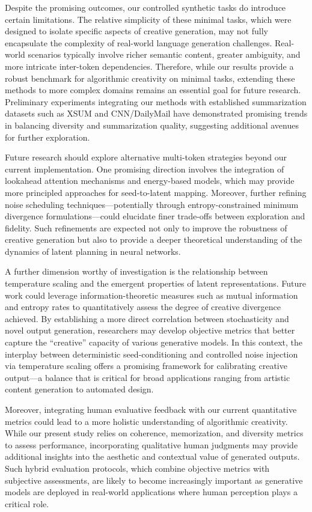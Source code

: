 \documentclass{article} %
\begin{document}
Despite the promising outcomes, our controlled synthetic tasks do introduce certain limitations. The relative simplicity of these minimal tasks, which were designed to isolate specific aspects of creative generation, may not fully encapsulate the complexity of real-world language generation challenges. Real-world scenarios typically involve richer semantic content, greater ambiguity, and more intricate inter-token dependencies. Therefore, while our results provide a robust benchmark for algorithmic creativity on minimal tasks, extending these methods to more complex domains remains an essential goal for future research. Preliminary experiments integrating our methods with established summarization datasets such as XSUM and CNN/DailyMail have demonstrated promising trends in balancing diversity and summarization quality, suggesting additional avenues for further exploration.

Future research should explore alternative multi-token strategies beyond our current implementation. One promising direction involves the integration of lookahead attention mechanisms and energy-based models, which may provide more principled approaches for seed-to-latent mapping. Moreover, further refining noise scheduling techniques—potentially through entropy-constrained minimum divergence formulations—could elucidate finer trade-offs between exploration and fidelity. Such refinements are expected not only to improve the robustness of creative generation but also to provide a deeper theoretical understanding of the dynamics of latent planning in neural networks.

A further dimension worthy of investigation is the relationship between temperature scaling and the emergent properties of latent representations. Future work could leverage information-theoretic measures such as mutual information and entropy rates to quantitatively assess the degree of creative divergence achieved. By establishing a more direct correlation between stochasticity and novel output generation, researchers may develop objective metrics that better capture the “creative” capacity of various generative models. In this context, the interplay between deterministic seed-conditioning and controlled noise injection via temperature scaling offers a promising framework for calibrating creative output—a balance that is critical for broad applications ranging from artistic content generation to automated design.

Moreover, integrating human evaluative feedback with our current quantitative metrics could lead to a more holistic understanding of algorithmic creativity. While our present study relies on coherence, memorization, and diversity metrics to assess performance, incorporating qualitative human judgments may provide additional insights into the aesthetic and contextual value of generated outputs. Such hybrid evaluation protocols, which combine objective metrics with subjective assessments, are likely to become increasingly important as generative models are deployed in real-world applications where human perception plays a critical role.
\end{document}
